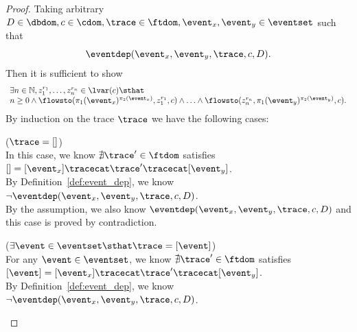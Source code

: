 \begin{proof}

  Taking arbitrary $D \in \dbdom , c \in \cdom, \trace \in \ftdom, \event_x, \event_y \in \eventset$
  such that
  \[
  \eventdep(\event_x, \event_y, \trace, c, D).
  \]
  Then it is sufficient to show
  \[
    \begin{array}{l}
    \exists n \in \mathbb{N}, z_1^{r_1}, \ldots, z_n^{r_n} \in \lvar(c) \sthat 
    \\
         n \geq 0 \land
         \flowsto(\pi_1(\event_x)^{\pi_2(\event_x)},  z_1^{r_1}, c) 
         \land \ldots \land \flowsto(z_n^{r_n},  \pi_1(\event_y)^{\pi_2(\event_y)}, c) .
    \end{array}
  \]
   By induction on the trace $\trace$ we have the following cases:
    \begin{case}($\trace = {[]}$)
    \\
    In this case, we know
     $\nexists \trace' \in \ftdom$ satisfies $  [] = [\event_x] \tracecat \trace' \tracecat [\event_y]$.
     \\
    By Definition~\ref{def:event_dep}, we know
    $\neg \eventdep(\event_x, \event_y, \trace, c, D)$.
    \\
    By the assumption, we also know $\eventdep(\event_x, \event_y, \trace, c, D)$ and this case is proved by contradiction.
    \end{case}
    \begin{case}($\exists \event \in \eventset \sthat \trace = [\event]$)
    \\
    For any $\event \in \eventset$, we know
     $\nexists \trace' \in \ftdom$ satisfies $[\event] = [\event_x] \tracecat \trace' \tracecat [\event_y]$.
     \\
    By Definition~\ref{def:event_dep}, we know
    $\neg \eventdep(\event_x, \event_y, \trace, c, D)$.

\end{case}
\end{proof}
